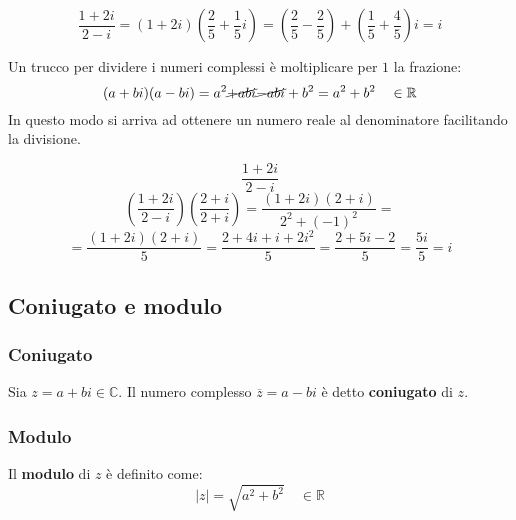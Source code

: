 \documentclass[a4paper]{article}
\theoremstyle{break}
\theoremstyle{break}
\theoremstyle{break}
\theoremstyle{break}
\begin{document}
\begin{figure}[H]
  \begin{example}
    \[
      \frac{1+2i}{2-i} = \left(1+2i\right)\left(\frac{2}{5}+\frac{1}{5}i\right) = \left( \frac{2}{5}-\frac{2}{5} \right) + \left( \frac{1}{5} + \frac{4}{5} \right) i = i
    \]
  \end{example}
\end{figure}

\noindent Un trucco per dividere i numeri complessi è moltiplicare per \( 1 \) la frazione:
\[
  (a+bi)(a-bi) = a^2 \cancel{+abi} \cancel{- abi} + b^2 = a^2 + b^2 \quad \in \mathbb{R}
\]
In questo modo si arriva ad ottenere un numero reale al denominatore facilitando la divisione.
\begin{figure}[H]
  \begin{example}
    \[
      \frac{1+2i}{2-i}
    \]
    \[
      \left( \frac{1+2i}{2-i} \right) \left( \frac{2+i}{2+i} \right) = \frac{(1+2i)(2+i)}{2^2+(-1)^2} =
    \]
    \[
      = \frac{(1+2i)(2+i)}{5} = \frac{2+4i+i+2i^2}{5} = \frac{2+5i-2}{5} = \frac{5i}{5} = i
    \]
  \end{example}
\end{figure}

\subsection{Coniugato e modulo}
\subsubsection{Coniugato}
Sia \( z = a +bi \in \mathbb{C} \). Il numero complesso \( \overline{z} = a - bi \) è detto
\textbf{coniugato} di \( z \).

\subsubsection{Modulo}
Il \textbf{modulo} di \( z \) è definito come:
\[
  |z| = \sqrt{a^2 + b^2} \quad \in \mathbb{R}
\]
\end{document}

